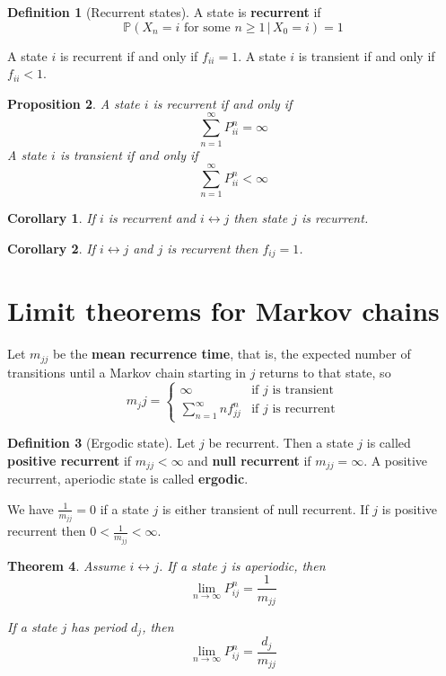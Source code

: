 \documentclass[10pt, oneside, reqno]{amsart}
\theoremstyle{plain}%
\newtheorem{thm}{Theorem}[section]
\newtheorem{prop}[thm]{Proposition}
\newtheorem*{cor}{Corollary}
\theoremstyle{definition}
\newtheorem{defn}[thm]{Definition}
\theoremstyle{remark}
\newcommand{\prob}[1]{\mathbb{P}(#1)}
\newcommand{\given}{ \, | \,}
\begin{document}
\begin{defn}[Recurrent states]
	A state is \textbf{recurrent} if \[
		\prob{X_n = i \text{ for some } n \geq 1 \given X_0 = i} = 1
	\]
	
	A state $i$ is recurrent if and only if $f_{ii} = 1$.  A state $i$ is transient if and only if $f_{ii} < 1$.
\end{defn}

\begin{prop}
	A state $i$ is recurrent if and only if \[
		\sum_{n=1}^\infty P^n_{ii} = \infty
	\]
A state $i$ is transient if and only if \[
	\sum_{n=1}^\infty P^n_{ii} < \infty
\]
\end{prop}

\begin{cor}
	If $i$ is recurrent and $i \leftrightarrow j$ then state $j$ is recurrent.
\end{cor}

\begin{cor}
	If $i \leftrightarrow j$ and $j$ is recurrent then $f_{ij} = 1$.
\end{cor}

\section{Limit theorems for Markov chains} %
\label{sub:limit_theorems_for_markov_chains}

Let $m_{jj}$ be the \textbf{mean recurrence time}, that is, the expected number of transitions until a Markov chain starting in $j$ returns to that state, so \[
	m_jj = \begin{cases}
		 \infty &\text{if $j$ is transient} \\
							\sum_{n=1}^\infty n f^n_{jj} &\text{if $j$ is recurrent}
	\end{cases}
\]

\begin{defn}[Ergodic state]
	Let $j$ be recurrent.  Then a state $j$ is called \textbf{positive recurrent} if $m_{jj} < \infty$ and \textbf{null recurrent} if $m_{jj} = \infty$.  A positive recurrent, aperiodic state is called \textbf{ergodic}.
\end{defn}

We have $\frac{1}{m_{jj}} = 0$ if a state $j$ is either transient of null recurrent.  If $j$ is positive recurrent then $0 < \frac{1}{m_{jj}} < \infty$. 


\begin{thm}
	Assume $i \leftrightarrow j$. If a state $j$ is aperiodic, then \[
		\lim_{n \rightarrow \infty} P^n_{ij} = \frac{1}{m_{jj}}
	\]
	
	If a state $j$ has period $d_j$, then \[
			\lim_{n \rightarrow \infty} P^n_{ij} = \frac{d_j}{m_{jj}}
	\]
\end{thm}
\end{document}
